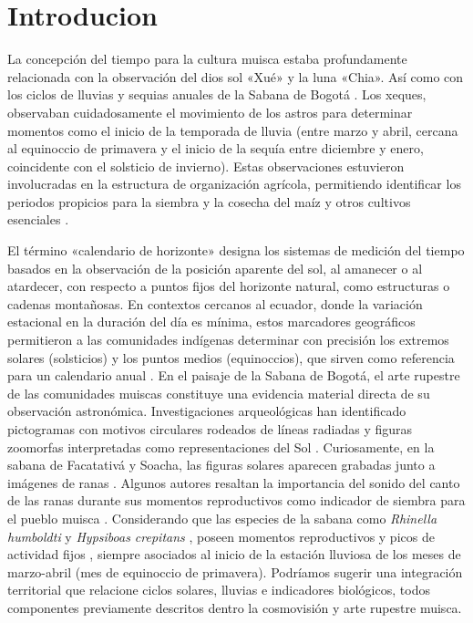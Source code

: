 \documentclass[a4paper,alpha-refs]{eSpectra}
\begin{document}
\section{Introducion}

La concepción del tiempo para la cultura muisca estaba profundamente relacionada con la observación del dios sol «Xué» y la luna «Chia». Así como con los ciclos de lluvias y sequias anuales de la Sabana de Bogotá \cite{langebaek_muiscas_2005}. Los xeques, observaban cuidadosamente el movimiento de los astros para determinar momentos como el inicio de la temporada de lluvia (entre marzo y abril, cercana al equinoccio de primavera y el inicio de la sequía entre diciembre y enero, coincidente con el solsticio de invierno).  Estas observaciones estuvieron involucradas en la estructura de organización agrícola, permitiendo identificar los periodos propicios para la siembra y la cosecha del maíz y otros cultivos esenciales \cite{duquesne_calendario_acosta_1848}.

El término «calendario de horizonte» designa los sistemas de medición del tiempo basados en la observación de la posición aparente del sol, al amanecer o al atardecer, con respecto a puntos fijos del horizonte natural, como estructuras o cadenas montañosas. En contextos cercanos al ecuador, donde la variación estacional en la duración del día es mínima, estos marcadores geográficos permitieron a las comunidades indígenas determinar con precisión los extremos solares (solsticios) y los puntos medios (equinoccios), que sirven como referencia para un calendario anual \cite{quijano_astronomia_2021}. En el paisaje de la Sabana de Bogotá, el arte rupestre de las comunidades muiscas constituye una evidencia material directa de su observación astronómica. Investigaciones arqueológicas han identificado pictogramas con motivos circulares rodeados de líneas radiadas y figuras zoomorfas interpretadas como representaciones del Sol \cite{munoz_animales_2009, martinez_manual_2004}. Curiosamente, en la sabana de Facatativá y Soacha, las figuras solares aparecen grabadas junto a imágenes de ranas \cite{saenz_cepeda_2020}. Algunos autores resaltan la importancia del sonido del canto de las ranas durante sus momentos reproductivos como indicador de siembra para el pueblo muisca \cite{duquesne_calendario_manuscript_1795}. Considerando que las especies de la sabana como \textit{Rhinella humboldti}  y  \textit{Hypsiboas crepitans} , poseen momentos reproductivos y picos de actividad fijos \cite{cortes_gallo_ecologia_reproductiva_2024}, siempre asociados al inicio de la estación lluviosa de los meses de marzo-abril (mes de equinoccio de primavera). Podríamos sugerir una integración territorial que relacione ciclos solares, lluvias e indicadores biológicos, todos componentes previamente descritos dentro la cosmovisión y arte rupestre muisca. 
\end{document}
